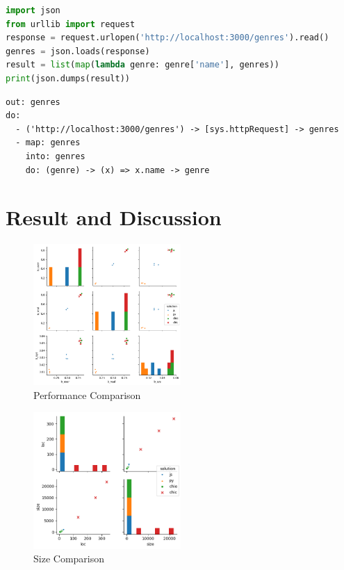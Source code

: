 \documentclass[conference]{IEEEtran}
\begin{document}
\begin{lstlisting}[caption=Python Solution for problem-g, label=pythonSolution, basicstyle=\footnotesize, breaklines=true, language=python]
import json
from urllib import request
response = request.urlopen('http://localhost:3000/genres').read()
genres = json.loads(response)
result = list(map(lambda genre: genre['name'], genres))
print(json.dumps(result))
\end{lstlisting}

\begin{lstlisting}[caption=CHIML Solution for problem-g, label=chimlSolution, basicstyle=\footnotesize, breaklines=true]
out: genres
do:
  - ('http://localhost:3000/genres') -> [sys.httpRequest] -> genres
  - map: genres
    into: genres
    do: (genre) -> (x) => x.name -> genre
\end{lstlisting}

\section{Result and Discussion}

\begin{figure}
  \centering
	\includegraphics[width=0.5\textwidth]
		{benchmark/benchmark.png}
	\caption{Performance Comparison}
	\label{fig:performanceComparison}
\end{figure}

\begin{figure}
  \centering
	\includegraphics[width=0.5\textwidth]
		{benchmark/size.png}
	\caption{Size Comparison}
	\label{fig:sizeComparison}
\end{figure}
\end{document}
